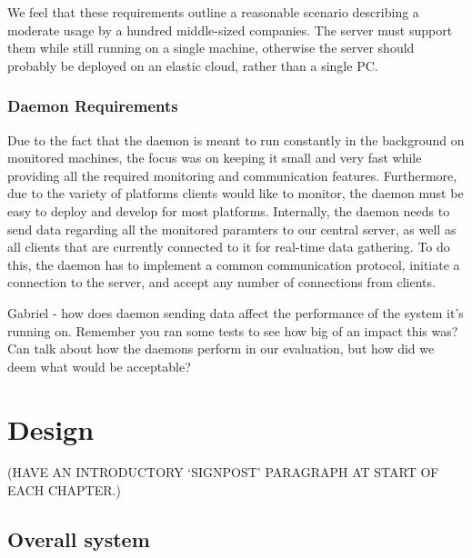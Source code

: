 \documentclass{l3proj}
\begin{document}
We feel that these requirements outline a reasonable scenario describing a moderate usage by a hundred middle-sized companies. The server must support them while still running on a single machine, otherwise the server should probably be deployed on an elastic cloud, rather than a single PC.

\subsection{Daemon Requirements}

Due to the fact that the daemon is meant to run constantly in the background on monitored machines, the focus was on keeping it small and very fast while providing all the required monitoring and communication features.
Furthermore, due to the variety of platforms clients would like to monitor, the daemon must be easy to deploy and develop for most platforms.
Internally, the daemon needs to send data regarding all the monitored paramters to our central server, as well as all clients that are currently connected to it for real-time data gathering.
To do this, the daemon has to implement a common communication protocol, initiate a connection to the server, and accept any number of connections from clients.


Gabriel - how does daemon sending data affect the performance of the system it's running on. Remember you ran some tests to see how big of an impact this was? Can talk about how the daemons perform in our evaluation, but how did we deem what would be acceptable?



\chapter{Design}
\label{design}

(HAVE AN INTRODUCTORY `SIGNPOST' PARAGRAPH AT START OF EACH CHAPTER.)


\section{Overall system}
\end{document}
